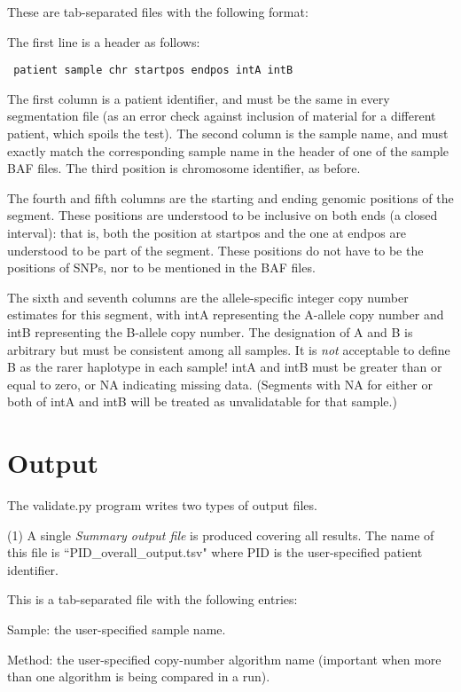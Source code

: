 \documentclass{article}
\begin{document}
These are tab-separated files with the following format:

The first line is a header as follows:

{\flushleft
{\tt
patient	sample	chr	startpos	endpos	intA	intB \\
}
}
\bigskip

The first column is a patient identifier, and must be the same in 
every segmentation file (as an error check against inclusion of
material for a different patient, which spoils the test).  The
second column is the sample name, and must exactly match the
corresponding sample name in the header of one of the sample BAF
files.  The third position is chromosome identifier, as before.

The fourth and fifth columns are the starting and ending genomic
positions of the segment.  These positions are understood to be
inclusive on both ends (a closed interval):  that is, both the
position at startpos and the one at endpos are understood to be
part of the segment.  These positions do not have to be the positions
of SNPs, nor to be mentioned in the BAF files.

The sixth and seventh columns are the allele-specific integer
copy number estimates for this segment, with intA representing
the A-allele copy number and intB representing the B-allele copy
number.  The designation of A and B is arbitrary but must be
consistent among all samples.  It is {\it not} acceptable to
define B as the rarer haplotype in each sample!  intA and intB
must be greater than or equal to zero, or NA indicating missing
data.  (Segments with NA for either or both of intA and intB
will be treated as unvalidatable for that sample.)

\section*{Output}

The validate.py program writes two types of output files.

(1)  A single {\it Summary output file} is produced covering
all results.  The name of this file is ``PID\_overall\_output.tsv"
where PID is the user-specified patient identifier.

This is a tab-separated file with the following entries:

Sample:  the user-specified sample name.

Method:  the user-specified copy-number algorithm name (important
when more than one algorithm is being compared in a run).
\end{document}
